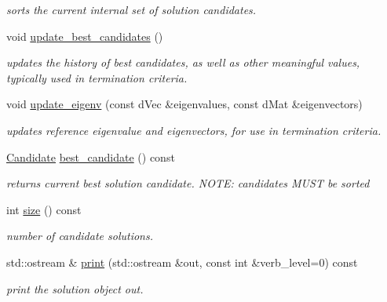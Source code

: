 \begin{DoxyCompactItemize}
\begin{DoxyCompactList}\small\item\em sorts the current internal set of solution candidates. \end{DoxyCompactList}\item 
void \hyperlink{classlibcmaes_1_1CMASolutions_a207c159be5f8668f018d564a1adb8dc8}{update\-\_\-best\-\_\-candidates} ()
\begin{DoxyCompactList}\small\item\em updates the history of best candidates, as well as other meaningful values, typically used in termination criteria. \end{DoxyCompactList}\item 
void \hyperlink{classlibcmaes_1_1CMASolutions_a28a20c0a90712e4f28038af2a4bd320b}{update\-\_\-eigenv} (const d\-Vec \&eigenvalues, const d\-Mat \&eigenvectors)
\begin{DoxyCompactList}\small\item\em updates reference eigenvalue and eigenvectors, for use in termination criteria. \end{DoxyCompactList}\item 
\hyperlink{classlibcmaes_1_1Candidate}{Candidate} \hyperlink{classlibcmaes_1_1CMASolutions_a218f2ee7bbd91d385f23082bfe18b1d9}{best\-\_\-candidate} () const 
\begin{DoxyCompactList}\small\item\em returns current best solution candidate. N\-O\-T\-E\-: candidates M\-U\-S\-T be sorted \end{DoxyCompactList}\item 
int \hyperlink{classlibcmaes_1_1CMASolutions_a7a7e71c54967613717d2928a38715429}{size} () const 
\begin{DoxyCompactList}\small\item\em number of candidate solutions. \end{DoxyCompactList}\item 
std\-::ostream \& \hyperlink{classlibcmaes_1_1CMASolutions_a6efb92b35de0ffa6cbe5918c82469db2}{print} (std\-::ostream \&out, const int \&verb\-\_\-level=0) const 
\begin{DoxyCompactList}\small\item\em print the solution object out. \end{DoxyCompactList}\end{DoxyCompactItemize}

